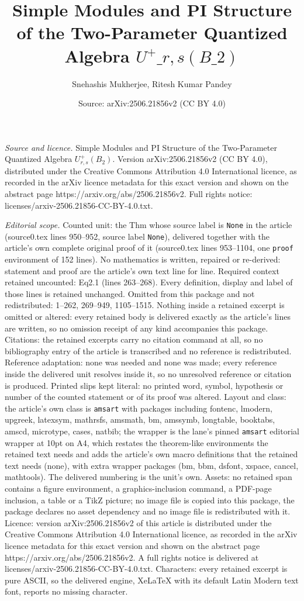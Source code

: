 \documentclass[10pt,a4paper]{amsart}
\title[Simple Modules and PI Structure of the Two-Parameter Quantiz]{Simple Modules and PI Structure of the Two-Parameter Quantized Algebra $U^+\_{r,s}(B\_2)$}
\author{Snehashis Mukherjee, Ritesh Kumar Pandey}
\date{Source: arXiv:2506.21856v2 (CC BY 4.0)}
\begin{document}
\maketitle

\noindent\emph{Source and licence.} Simple Modules and PI Structure of the Two-Parameter Quantized Algebra $U^+_{r,s}(B_2)$. Version arXiv:2506.21856v2 (CC BY 4.0), distributed under the Creative Commons Attribution 4.0 International licence, as recorded in the arXiv licence metadata for this exact version and shown on the abstract page https://arxiv.org/abs/2506.21856v2. Full rights notice: licenses/arxiv-2506.21856-CC-BY-4.0.txt.\par\smallskip

\noindent\textit{Editorial scope.} Counted unit: the Thm whose source label is \texttt{None} in the article (source0.tex lines 950--952, source label \texttt{None}), delivered together with the article's own complete original proof of it (source0.tex lines 953--1104, one \texttt{proof} environment of 152 lines). No mathematics is written, repaired or re-derived: statement and proof are the article's own text line for line. Required context retained uncounted: Eq2.1 (lines 263--268). Every definition, display and label of those lines is retained unchanged. Omitted from this package and not redistributed: 1--262, 269--949, 1105--1515. Nothing inside a retained excerpt is omitted or altered: every retained body is delivered exactly as the article's lines are written, so no omission receipt of any kind accompanies this package. Citations: the retained excerpts carry no citation command at all, so no bibliography entry of the article is transcribed and no reference is redistributed. Reference adaptation: none was needed and none was made; every reference inside the delivered unit resolves inside it, so no unresolved reference or citation is produced. Printed slips kept literal: no printed word, symbol, hypothesis or number of the counted statement or of its proof was altered. Layout and class: the article's own class is \texttt{amsart} with packages including fontenc, lmodern, upgreek, latexsym, mathrsfs, amsmath, bm, amssymb, longtable, booktabs, amscd, microtype, cases, natbib; the wrapper is the lane's pinned \texttt{amsart} editorial wrapper at 10pt on A4, which restates the theorem-like environments the retained text needs and adds the article's own macro definitions that the retained text needs (none), with extra wrapper packages (bm, bbm, dsfont, xspace, cancel, mathtools). The delivered numbering is the unit's own. Assets: no retained span contains a figure environment, a graphics-inclusion command, a PDF-page inclusion, a table or a TikZ picture; no image file is copied into this package, the package declares no asset dependency and no image file is redistributed with it. Licence: version arXiv:2506.21856v2 of this article is distributed under the Creative Commons Attribution 4.0 International licence, as recorded in the arXiv licence metadata for this exact version and shown on the abstract page https://arxiv.org/abs/2506.21856v2. A full rights notice is delivered at licenses/arxiv-2506.21856-CC-BY-4.0.txt. Characters: every retained excerpt is pure ASCII, so the delivered engine, XeLaTeX with its default Latin Modern text font, reports no missing character.
\end{document}

